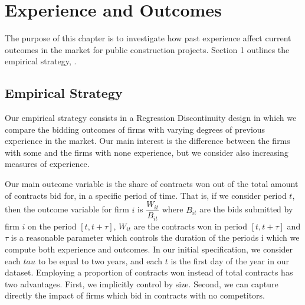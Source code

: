 \chapter{Experience and Outcomes
}
The purpose of this chapter is to investigate how past experience affect current outcomes in the market for public construction projects. Section 1 outlines the empirical strategy, .
\section{Empirical Strategy}
Our empirical strategy consists in a Regression Discontinuity design in which we compare the bidding outcomes of firms with varying degrees of previous experience in the market. Our main interest is the difference between the firms with some and the firms with none experience, but we consider also increasing measures of experience.

Our main outcome variable is the share of contracts won out of the total amount of contracts bid for, in a specific period of time. That is, if we consider period $t$, then the outcome variable for firm $i$ is $\dfrac{W_{it}}{B_{it}}$ where $B_{it}$ are the bids submitted by firm $i$ on the period $[t,t+\tau]$, $W_{it}$ are the contracts won in period $[t,t+\tau]$ and $\tau$ is a reasonable parameter which controls the duration of the periods i which we compute both experience and outcomes. In our initial specification, we consider each $tau$ to be equal to two years, and each $t$ is the first day of the year in our dataset. Employing a proportion of contracts won instead of total contracts has two advantages. First, we implicitly control by size. Second, we can capture directly the impact of firms which bid in contracts with no competitors.


